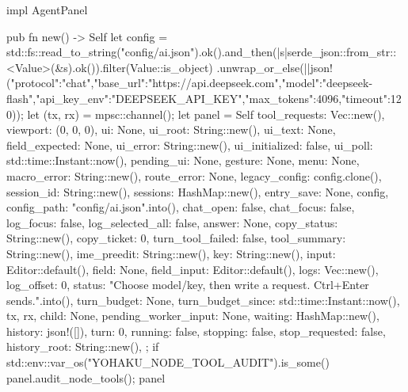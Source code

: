 impl AgentPanel {
    pub fn new() -> Self {
        let config = std::fs::read_to_string("config/ai.json").ok().and_then(|s|serde_json::from_str::<Value>(&s).ok()).filter(Value::is_object)
            .unwrap_or_else(||json!({"protocol":"chat","base_url":"https://api.deepseek.com","model":"deepseek-flash","api_key_env":"DEEPSEEK_API_KEY","max_tokens":4096,"timeout":120}));
        let (tx, rx) = mpsc::channel();
        let panel = Self {
            tool_requests: Vec::new(),
            viewport: (0, 0, 0),
            ui: None,
            ui_root: String::new(),
            ui_text: None,
            field_expected: None,
            ui_error: String::new(),
            ui_initialized: false,
            ui_poll: std::time::Instant::now(),
            pending_ui: None,
            gesture: None,
            menu: None,
            macro_error: String::new(),
            route_error: None,
            legacy_config: config.clone(),
            session_id: String::new(),
            sessions: HashMap::new(),
            entry_save: None,
            config,
            config_path: "config/ai.json".into(),
            chat_open: false,
            chat_focus: false,
            log_focus: false,
            log_selected_all: false,
            answer: None,
            copy_status: String::new(),
            copy_ticket: 0,
            turn_tool_failed: false,
            tool_summary: String::new(),
            ime_preedit: String::new(),
            key: String::new(),
            input: Editor::default(),
            field: None,
            field_input: Editor::default(),
            logs: Vec::new(),
            log_offset: 0,
            status: "Choose model/key, then write a request. Ctrl+Enter sends.".into(),
            turn_budget: None,
            turn_budget_since: std::time::Instant::now(),
            tx,
            rx,
            child: None,
            pending_worker_input: None,
            waiting: HashMap::new(),
            history: json!([]),
            turn: 0,
            running: false,
            stopping: false,
            stop_requested: false,
            history_root: String::new(),
        };
        if std::env::var_os("YOHAKU_NODE_TOOL_AUDIT").is_some() {
            panel.audit_node_tools();
        }
        panel
    }

}
